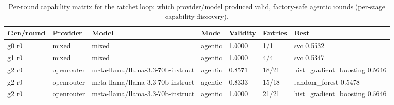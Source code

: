 \begin{table}[H]
\centering\small
\caption{Per-round capability matrix for the ratchet loop: which provider/model produced valid, factory-safe agentic rounds (per-stage capability discovery).}
\label{tab:ratchet-rounds-ratchet-ledger-crypto}
\begin{tabular}{lllllll}
\toprule
Gen/round & Provider & Model & Mode & Validity & Entries & Best \\
\midrule
g0 r0 & mixed & mixed & agentic & 1.0000 & 1/1 & svc 0.5532 \\
g1 r0 & mixed & mixed & agentic & 1.0000 & 4/4 & svc 0.5347 \\
g2 r0 & openrouter & meta-llama/llama-3.3-70b-instruct & agentic & 0.8571 & 18/21 & hist\_gradient\_boosting 0.5646 \\
g2 r0 & openrouter & meta-llama/llama-3.3-70b-instruct & agentic & 0.8333 & 15/18 & random\_forest 0.5478 \\
g2 r0 & openrouter & meta-llama/llama-3.3-70b-instruct & agentic & 1.0000 & 21/21 & hist\_gradient\_boosting 0.5646 \\
\bottomrule
\end{tabular}
\end{table}
